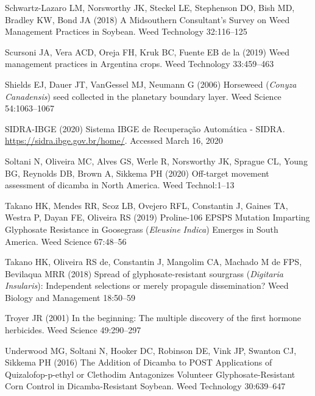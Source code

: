 \documentclass[
  12pt,
  a4paper]{article}
\begin{document}
\leavevmode\hypertarget{ref-schwartz-lazaro_midsouthern_2018}{}%
Schwartz-Lazaro LM, Norsworthy JK, Steckel LE, Stephenson DO, Bish MD,
Bradley KW, Bond JA (2018) A Midsouthern Consultant's Survey on Weed
Management Practices in Soybean. Weed Technology 32:116--125

\leavevmode\hypertarget{ref-scursoni_weed_2019}{}%
Scursoni JA, Vera ACD, Oreja FH, Kruk BC, Fuente EB de la (2019) Weed
management practices in Argentina crops. Weed Technology 33:459--463

\leavevmode\hypertarget{ref-shields_horseweed_2006}{}%
Shields EJ, Dauer JT, VanGessel MJ, Neumann G (2006) Horseweed
(\emph{Conyza} \emph{Canadensis}) seed collected in the planetary
boundary layer. Weed Science 54:1063--1067

\leavevmode\hypertarget{ref-sidra-ibge_sistema_2020}{}%
SIDRA-IBGE (2020) Sistema IBGE de Recuperação Automática - SIDRA.
\url{https://sidra.ibge.gov.br/home/}. Accessed March 16, 2020

\leavevmode\hypertarget{ref-soltani_off-target_2020}{}%
Soltani N, Oliveira MC, Alves GS, Werle R, Norsworthy JK, Sprague CL,
Young BG, Reynolds DB, Brown A, Sikkema PH (2020) Off-target movement
assessment of dicamba in North America. Weed Technol:1--13

\leavevmode\hypertarget{ref-takano_proline-106_2019}{}%
Takano HK, Mendes RR, Scoz LB, Ovejero RFL, Constantin J, Gaines TA,
Westra P, Dayan FE, Oliveira RS (2019) Proline-106 EPSPS Mutation
Imparting Glyphosate Resistance in Goosegrass (\emph{Eleusine}
\emph{Indica}) Emerges in South America. Weed Science 67:48--56

\leavevmode\hypertarget{ref-takano_spread_2018}{}%
Takano HK, Oliveira RS de, Constantin J, Mangolim CA, Machado M de FPS,
Bevilaqua MRR (2018) Spread of glyphosate-resistant sourgrass
(\emph{Digitaria} \emph{Insularis}): Independent selections or merely
propagule dissemination? Weed Biology and Management 18:50--59

\leavevmode\hypertarget{ref-troyer_beginning:_2001}{}%
Troyer JR (2001) In the beginning: The multiple discovery of the first
hormone herbicides. Weed Science 49:290--297

\leavevmode\hypertarget{ref-underwood_addition_2016}{}%
Underwood MG, Soltani N, Hooker DC, Robinson DE, Vink JP, Swanton CJ,
Sikkema PH (2016) The Addition of Dicamba to POST Applications of
Quizalofop-p-ethyl or Clethodim Antagonizes Volunteer
Glyphosate-Resistant Corn Control in Dicamba-Resistant Soybean. Weed
Technology 30:639--647
\end{document}
